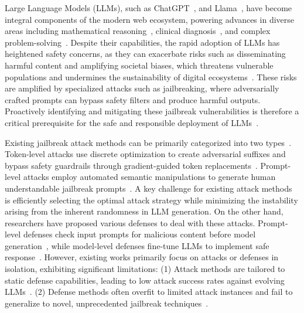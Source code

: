 \documentclass[11pt]{article}
\begin{document}
Large Language Models (LLMs), such as ChatGPT~\citep{achiam2023gpt}, and Llama~\citep{llama3}, have become integral components of the modern web ecosystem, powering advances in diverse areas including mathematical reasoning~\citep{romera2024mathematical}, clinical diagnosis~\citep{KACR}, and complex problem-solving~\citep{chang2024survey}. Despite their capabilities, the rapid adoption of LLMs has heightened safety concerns, as they can exacerbate risks such as disseminating harmful content and amplifying societal biases, which threatens vulnerable populations and undermines the sustainability of digital ecosystems~\citep{LiuKTSSWLL22,hsu2024safe}. These risks are amplified by specialized attacks such as jailbreaking, where adversarially crafted prompts can bypass safety filters and produce harmful outputs. Proactively identifying and mitigating these jailbreak vulnerabilities is therefore a critical prerequisite for the safe and responsible deployment of LLMs~\citep{hsu2024safe}.


Existing jailbreak attack methods can be primarily categorized into two types~\citep{xu2024comprehensive}. Token-level attacks use discrete optimization to create adversarial suffixes and bypass safety guardrails through gradient-guided token replacements~\citep{GCG}. Prompt-level attacks employ automated semantic manipulations to generate human understandable jailbreak prompts~\citep{PAIR}. A key challenge for existing attack methods is efficiently selecting the optimal attack strategy while minimizing the instability arising from the inherent randomness in LLM generation. On the other hand, researchers have proposed various defenses to deal with these attacks. Prompt-level defenses check input prompts for malicious content before model generation~\citep{smoothllm}, while model-level defenses fine-tune LLMs to implement safe response~\citep{safeRLHF}. However, existing works primarily focus on attacks or defenses in isolation, exhibiting significant limitations: (1) Attack methods are tailored to static defense capabilities, leading to low attack success rates against evolving LLMs~\citep{sun2024iterative,su2024mission}. (2) Defense methods often overfit to limited attack instances and fail to generalize to novel, unprecedented jailbreak techniques~\citep{rottger2024xstest}.
\end{document}
